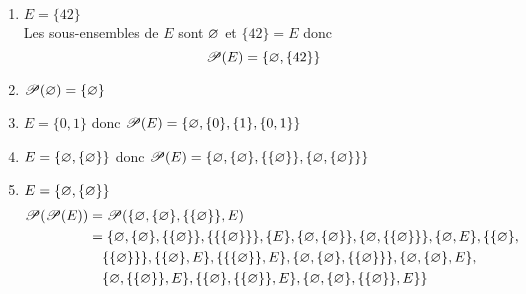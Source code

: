 \begin{exm}
	\begin{enumerate}
		\item $E = \{42\}$ \\
			Les sous-ensembles de $E$ sont $\varnothing$ et $\{42\} = E$ donc \[
				\mathcal{P}(E) = \{\varnothing, \{42\} \} 
			\] 
		\item $\mathcal{P}(\varnothing) = \{\varnothing\}$ 
		\item $E = \{0,1\}$ donc $\mathcal{P}(E) = \{\varnothing, \{0\}, \{1\}, \{0, 1\} \}$ 
		\item $E = \{\varnothing, \{\varnothing\}\}$ donc $\mathcal{P}(E) = \{\varnothing, \{\varnothing\}, \{\{\varnothing\}\}, \{\varnothing, \{\varnothing\} \} \} $ 
		\item $E = \{\varnothing, \{\varnothing\}\}$ \\
			\begin{align*}
				\mathcal{P}(\mathcal{P}(E)) &= \mathcal{P}(\{\varnothing, \{\varnothing\}, \{\{\varnothing\}\}, E)\\
				&= \{\varnothing, \{\varnothing\}, \{\{\varnothing\}\}, \{\{\{\varnothing\}\}\}, \{E\}, \{\varnothing, \{\varnothing\}\}, \{\varnothing, \{\{\varnothing\}\}\}, \{\varnothing, E\}, \{\{\varnothing\},\\
				&\quad\{\{\varnothing\}\}\}, \{\{\varnothing\}, E\}, \{\{\{\varnothing\}\}, E\}, \{\varnothing, \{\varnothing\}, \{\{\varnothing\}\}\}, \{\varnothing, \{\varnothing\}, E\},\\
				&\quad\{\varnothing, \{\{\varnothing\}\}, E\}, \{\{\varnothing\}, \{\{\varnothing\}\}, E\}, \{\varnothing, \{\varnothing\}, \{\{\varnothing\}\}, E\}\}\
			\end{align*}
	\end{enumerate}
\end{exm}

